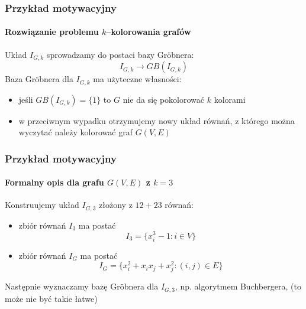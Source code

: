 \documentclass{beamer}
\begin{document}
\begin{frame}
    \frametitle{Przykład motywacyjny}
    \framesubtitle{Rozwiązanie problemu $k$--kolorowania grafów}

    Układ $I_{G,k}$ sprowadzamy do postaci bazy Gr\"{o}bnera:
    \begin{equation*}
        I_{G,k} \rightarrow GB(I_{G,k})
    \end{equation*}
    \pause
    Baza Gr\"{o}bnera dla $I_{G,k}$ ma użyteczne własności:
    \begin{itemize}
        \item jeśli $GB(I_{G,k}) = \{1\}$ to $G$ nie da się pokolorować $k$ kolorami
        \pause
        \item w przeciwnym wypadku otrzymujemy nowy układ równań, z którego można wyczytać
         należy kolorować graf $G(V, E)$
    \end{itemize}
\end{frame}

\begin{frame}
    \frametitle{Przykład motywacyjny}
    \framesubtitle{Formalny opis dla grafu $G(V,E)$ z $k=3$}

    Konstruujemy układ $I_{G,3}$ złożony z $12 + 23$ równań:
    \begin{itemize}
        \item zbiór równań $I_3$ ma postać
            \begin{equation*}
                I_3 = \{ x_i^3 - 1 : i \in V \}
            \end{equation*}
            \pause
        \item zbiór równań $I_G$ ma postać
            \begin{equation*}
                I_G = \{ x_i^2 + x_i x_j + x_j^2 : (i,j) \in E \}
            \end{equation*}
    \end{itemize}
    \pause
    Następnie wyznaczamy bazę Gr\"{o}bnera dla $I_{G,3}$, np. algorytmem
    Buchbergera, \structure{$\ldots$} (to może nie być takie łatwe)
\end{frame}
\end{document}
